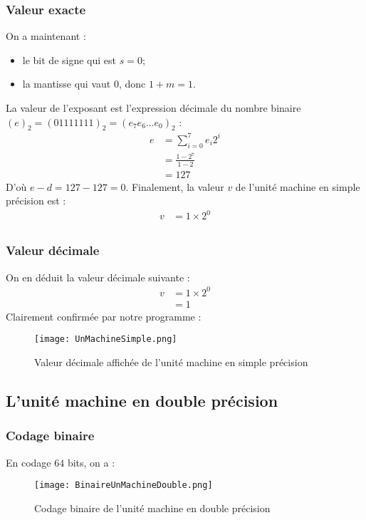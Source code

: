 \documentclass[a4paper, titlepage]{livret} %
\begin{document}
				\subsubsection{Valeur exacte}
					On a maintenant : 
					\begin{itemize}
						\item le bit de signe qui est $s = 0$;
						\item la mantisse qui vaut $0$, donc $1+m = 1$.
					\end{itemize}
					La valeur de l'exposant est l'expression décimale du nombre binaire $(e)_{2} = (01111111)_{2} = (e_{7}e_{6}…e_{0})_{2}$ :
					\[\begin{aligned}
						e & = \sum_{i=0}^{7} e_{i}2^{i}\\
						  & = \frac{1 - 2^{7}}{1 - 2}\\
						  & = 127
					\end{aligned}\]
					D'où $e - d = 127 - 127 = 0$.
					Finalement, la valeur $v$ de l'unité machine en simple précision est :
					\[\begin{aligned}
						v & = 1 \times 2^{0}\\
					\end{aligned}\]

				\subsubsection{Valeur décimale}
					On en déduit la valeur décimale suivante :
					\[\begin{aligned}
						v & = 1 \times 2^{0}\\
						  & = 1
					\end{aligned}\]
					Clairement confirmée par notre programme :
					\begin{figure}[!h]
						\centering
  							\texttt{[image: UnMachineSimple.png]}
  							\caption{Valeur décimale affichée de l'unité machine en simple précision}
					\end{figure}

			\subsection{L'unité machine en double précision}
				\subsubsection{Codage binaire}
					En codage $64$ bits, on a :
					\begin{figure}[!h]
						\centering
  							\texttt{[image: BinaireUnMachineDouble.png]}
  							\caption{Codage binaire de l'unité machine en double précision}
					\end{figure}
\end{document}
